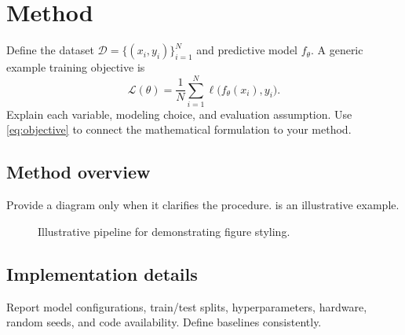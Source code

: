 \section{Method}\label{sec:method}
Define the dataset $\mathcal{D}=\{(x_i,y_i)\}_{i=1}^{N}$ and predictive
model $f_{\theta}$. A generic example training objective is
\begin{equation}\label{eq:objective}
\mathcal{L}(\theta)=\frac{1}{N}\sum_{i=1}^{N}
\ell\bigl(f_{\theta}(x_i),y_i\bigr).
\end{equation}
Explain each variable, modeling choice, and evaluation assumption. Use
\cref{eq:objective} to connect the mathematical formulation to your method.

\subsection{Method overview}
Provide a diagram only when it clarifies the procedure. 
is an illustrative example.
\begin{figure}[t]
\centering
{}
\caption{Illustrative pipeline for demonstrating figure styling.}
\label{fig:overview}
\end{figure}

\subsection{Implementation details}
Report model configurations, train/test splits, hyperparameters, hardware,
random seeds, and code availability. Define baselines consistently.
